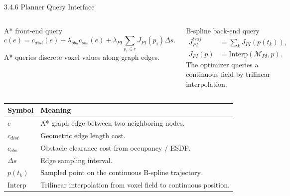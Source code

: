 \documentclass[10pt,aspectratio=169,xcolor=dvipsnames]{beamer}
\newcommand{\Interp}{\mathrm{Interp}}
\newcommand{\Mmap}{\mathcal{M}}
\begin{document}
\begin{frame}{3.4.6 Planner Query Interface}
  \small
  \begin{columns}[T]
    \begin{block}{A* front-end query}
      \[
        c(e)=c_{dist}(e)+\lambda_{obs}c_{obs}(e)+\lambda_{PI}\sum_{p_i\in e}J_{PI}(p_i)\Delta s.
      \]
      \footnotesize A* queries discrete voxel values along graph edges.
    \end{block}

    \begin{exampleblock}{B-spline back-end query}
      \[
        \begin{aligned}
          J^{traj}_{PI}&=\sum_k J_{PI}(p(t_k)),\\
          J_{PI}(p)&=\Interp(\Mmap_{PI},p).
        \end{aligned}
      \]
      \footnotesize The optimizer queries a continuous field by trilinear interpolation.
    \end{exampleblock}
  \end{columns}

  \begin{table}\scriptsize
    \begin{tabular}{p{} p{}}
      \toprule
      \textbf{Symbol} & \textbf{Meaning}\\
      \midrule
      $e$ & A* graph edge between two neighboring nodes.\\
      $c_{dist}$ & Geometric edge length cost.\\
      $c_{obs}$ & Obstacle clearance cost from occupancy / ESDF.\\
      $\Delta s$ & Edge sampling interval.\\
      $p(t_k)$ & Sampled point on the continuous B-spline trajectory.\\
      $\Interp$ & Trilinear interpolation from voxel field to continuous position.\\
      \bottomrule
    \end{tabular}
  \end{table}
\end{frame}
\end{document}
